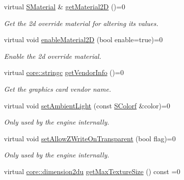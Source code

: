 \begin{DoxyCompactItemize}
virtual \hyperlink{classirr_1_1video_1_1SMaterial}{S\+Material} \& \hyperlink{classirr_1_1video_1_1IVideoDriver_a198bbe60fdb1b5d6d0f4921e8a26109c}{get\+Material2D} ()=0
\begin{DoxyCompactList}\small\item\em Get the 2d override material for altering its values. \end{DoxyCompactList}\item 
virtual void \hyperlink{classirr_1_1video_1_1IVideoDriver_a7686a41fe0f506bb04c262f724f65756}{enable\+Material2D} (bool enable=true)=0
\begin{DoxyCompactList}\small\item\em Enable the 2d override material. \end{DoxyCompactList}\item 
\mbox{\label{classirr_1_1video_1_1IVideoDriver_a221a3ee79676ad9fbebc39cf0150516e}} 
virtual \hyperlink{namespaceirr_1_1core_ab26a0e0359206b5a694f35c37c829d7f}{core\+::stringc} \hyperlink{classirr_1_1video_1_1IVideoDriver_a221a3ee79676ad9fbebc39cf0150516e}{get\+Vendor\+Info} ()=0
\begin{DoxyCompactList}\small\item\em Get the graphics card vendor name. \end{DoxyCompactList}\item 
virtual void \hyperlink{classirr_1_1video_1_1IVideoDriver_aaba8d96a8061264393fc74ac9a3cd04f}{set\+Ambient\+Light} (const \hyperlink{classirr_1_1video_1_1SColorf}{S\+Colorf} \&color)=0
\begin{DoxyCompactList}\small\item\em Only used by the engine internally. \end{DoxyCompactList}\item 
virtual void \hyperlink{classirr_1_1video_1_1IVideoDriver_af78022589e5b7cb42b4d6ed2f7950e42}{set\+Allow\+Z\+Write\+On\+Transparent} (bool flag)=0
\begin{DoxyCompactList}\small\item\em Only used by the engine internally. \end{DoxyCompactList}\item 
\mbox{\label{classirr_1_1video_1_1IVideoDriver_a9bc9632861757d167c035bb5ecfa6854}} 
virtual \hyperlink{namespaceirr_1_1core_a13e5bd7e47b2014eefc870ede11bbbbc}{core\+::dimension2du} \hyperlink{classirr_1_1video_1_1IVideoDriver_a9bc9632861757d167c035bb5ecfa6854}{get\+Max\+Texture\+Size} () const =0

\end{DoxyCompactItemize}
